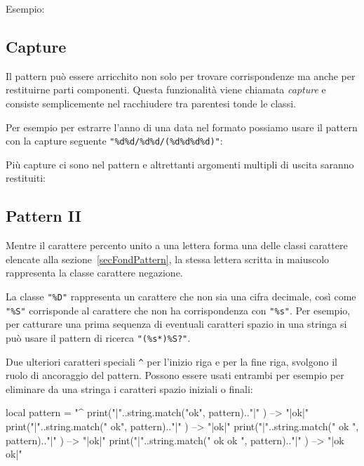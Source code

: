 Esempio:

\subsection{Capture}
\label{secFondCapture}

Il pattern può essere arricchito non solo per trovare corrispondenze ma anche
per restituirne parti componenti. Questa funzionalità viene chiamata
\emph{capture} e consiste semplicemente nel racchiudere tra parentesi tonde le
classi.

Per esempio per estrarre l'anno di una data nel formato 
possiamo usare il pattern con la capture seguente \verb|"%d%d/%d%d/(%d%d%d%d)"|:

Più capture ci sono nel pattern e altrettanti argomenti multipli di uscita
saranno restituiti:


\subsection{Pattern II}

Mentre il carattere percento unito a una lettera forma una delle classi
carattere elencate alla sezione~\ref{secFondPattern}, la stessa lettera scritta
in maiuscolo rappresenta la classe carattere negazione.

La classe \verb|"%D"| rappresenta un carattere che non sia una cifra decimale,
così come \verb|"%S"| corrisponde al carattere che non ha corrispondenza con
\verb|"%s"|. Per esempio, per catturare una prima sequenza di eventuali
caratteri spazio in una stringa si può usare il pattern di ricerca
\verb|"(%s*)%S?"|. 

Due ulteriori caratteri speciali \verb|^| per l'inizio riga e \key{\$} per la
fine riga, svolgono il ruolo di ancoraggio del pattern. Possono essere usati
entrambi per esempio per eliminare da una stringa i caratteri spazio iniziali o
finali:
\begin{lines}
local pattern = "^%
print("|"..string.match("ok", pattern).."|" )      --> "|ok|"
print("|"..string.match(" ok", pattern).."|" )     --> "|ok|"
print("|"..string.match(" ok ", pattern).."|" )    --> "|ok|"
print("|"..string.match(" ok ok ", pattern).."|" ) --> "|ok ok|"
\end{lines}

